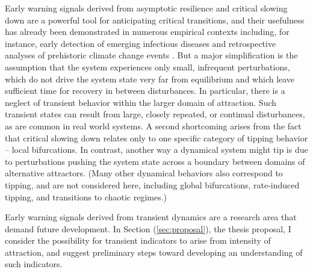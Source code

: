 Early warning signals derived from asymptotic resilience and critical slowing down are a powerful tool for anticipating critical transitions, and their usefulness has already been demonstrated in numerous empirical contexts including, for instance, early detection of emerging infectious diseases \cite{brettDynamicalFootprintsEnable2020} and retrospective analyses of prehistoric climate change events \cite{dakosSlowingEarlyWarning2008a}. But a major simplification is the assumption that the system experiences only small, infrequent perturbations, which do not drive the system state very far from equilibrium and which leave sufficient time for recovery in between disturbances. In particular, there is a neglect of transient behavior within the larger domain of attraction. Such transient states can result from large, closely repeated, or continual disturbances, as are common in real world systems. A second shortcoming arises from the fact that critical slowing down relates only to one specific category of tipping behavior -- local bifurcations. In contrast, another way a dynamical system might tip is due to perturbations pushing the system state across a boundary between domains of alternative attractors. (Many other dynamical behaviors also correspond to tipping, and are not considered here, including global bifurcations, rate-induced tipping, and transitions to chaotic regimes.)


Early warning signals derived from transient dynamics are a research area that demand future development. In Section (\ref{sec:proposal}), the thesis proposal, I consider the possibility for transient indicators to arise from intensity of attraction, and suggest preliminary steps toward developing an understanding of such indicators. %








